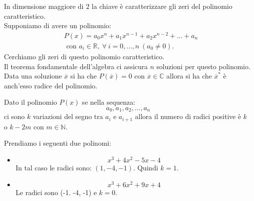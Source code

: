 In dimensione maggiore di $2$ la chiave è caratterizzare gli zeri del polinomio caratteristico.\\
Supponiamo di avere un polinomio: 
\[\begin{aligned}
    &P(x) = a_0 x^{n}+ a_1x^{n-1} + a_2 x^{n-2}+ \ldots + a_{n} \\
    &\text{ con  } a_i \in \mathbb{R}, \ \forall  \ i = 0 , \ldots, n \ (a_0\neq 0)
.\end{aligned}\]
Cerchiamo gli zeri di questo polinomio caratteristico.\\
Il teorema fondamentale dell'algebra ci assicura $n$ soluzioni per questo polinomio. \\ 
Data una soluzione $\overline{x}$ si ha che $P(\overline{x}) = 0$ con $\overline{x}\in \mathbb{C}$ allora si ha che $\overline{x}^*$ è anch'esso radice del polinomio.
\begin{thm}
    Dato il polinomio $P(x)$ se nella sequenza:
    \[
        a_0, a_1, a_2, \ldots, a_n
    \] 
    ci sono $k$ variazioni del segno tra $a_i $ e $a_{i+1}$ allora il numero di radici positive è $k$ o $k-2m$ con $m \in \mathbb{N}$.
\end{thm}
\noindent
\begin{exmp}
    Prendiamo i seguenti due polinomi:
    \begin{itemize}
        \item 
	    \[
        	x^3 + 4 x^2 - 5x - 4 
        	\] 
        	In tal caso le radici sono: $(1, -4, -1)$. Quindi $k = 1$.
	\item 
        \[
        x^3 + 6 x^2 + 9 x + 4
    \] 
    Le radici sono (-1. -4, -1) e $k=0$.
    \end{itemize}
\end{exmp}
\noindent
